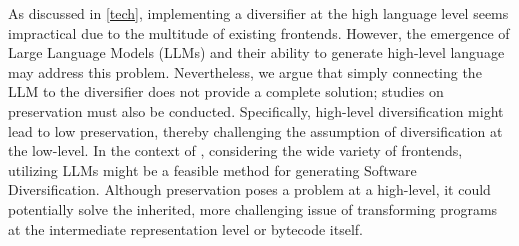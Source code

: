 \begin{strategy}
    As discussed in \autoref{tech}, implementing a diversifier at the high language level seems impractical due to the multitude of existing frontends.
    However, the emergence of Large Language Models (LLMs) and their ability to generate high-level language may address this problem. 
    Nevertheless, we argue that simply connecting the LLM to the diversifier does not provide a complete solution; studies on preservation must also be conducted.
    Specifically, high-level diversification might lead to low preservation, thereby challenging the assumption of diversification at the low-level.
    In the context of \Wasm, considering the wide variety of frontends, utilizing LLMs might be a feasible method for generating Software Diversification.
    Although preservation poses a problem at a high-level, it could potentially solve the inherited, more challenging issue of transforming programs at the intermediate representation level or \Wasm bytecode itself.
 
\end{strategy}
